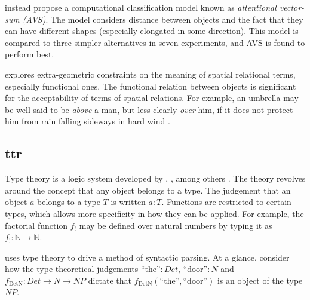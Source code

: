 \cite{RegierGroundingspatiallanguage2001a} instead propose a computational classification model known as \textit{attentional vector-sum (AVS)}.
The model considers distance between objects and the fact that they can have different shapes (especially elongated in some direction).
This model is compared to three simpler alternatives in seven experiments, and AVS is found to perform best.

\cite{CoventryInterplayGeometryFunction2001} explores extra-geometric constraints on the meaning of spatial relational terms, especially functional ones.
The functional relation between objects is significant for the acceptability of terms of spatial relations.
For example, an umbrella may be well said to be \textit{above} a man, but less clearly \textit{over} him, if it does not protect him from rain falling sideways in hard wind \citep{CoventryInterplayGeometryFunction2001}.




\subsection{\Acrfull{ttr}}
\label{sec:ttnlp}

Type theory is a logic system developed by \cite{WhiteheadPrincipiamathematica1910}, \cite{church40}, \cite{martinlof84} among others \citep{CoquandTypeTheory2015}.
The theory revolves around the concept that any object belongs to a type.
The judgement that an object $a$ belongs to a type $T$ is written $a:T$.
Functions are restricted to certain types, which allows more specificity in how they can be applied.
For example, the factorial function $f_!$ may be defined over natural numbers by typing it as $f_! :\mathbb{N} \rightarrow \mathbb{N}$.

\cite{RantaTypetheoreticalGrammar1995} uses type theory to drive a method of syntactic parsing.
At a glance, consider how the type-theoretical judgements $\text{``the''} : \mathit{Det}$, $\text{``door''} : \mathit{N}$ and $f_\text{DetN}:\mathit{Det}\rightarrow\mathit{N}\rightarrow\mathit{NP}$ dictate that $f_\text{DetN}(\text{``the''}, \text{``door''})$ is an object of the type $\mathit{NP}$.

